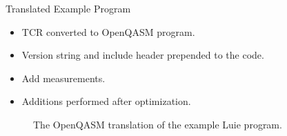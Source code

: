 \begin{frame}{Translated Example Program}    
        \begin{itemize}
            \item TCR converted to OpenQASM program.
            \item Version string and include header prepended to the code.
            \item Add measurements.
            \item Additions performed after optimization.
        \end{itemize}
    \vfill
    \begin{figure}
        \centering
        
        \caption{The OpenQASM translation of the example Luie program.}
    \end{figure}
\end{frame}

